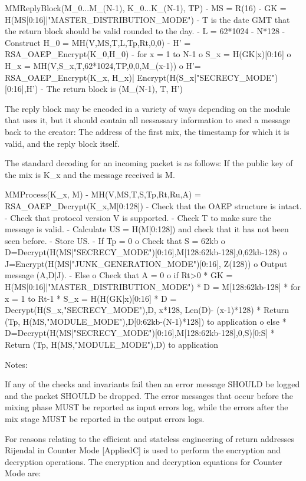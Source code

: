 MMReplyBlock(M_0...M_(N-1), K_0...K_(N-1), TP)
- MS = R(16)
- GK = H(MS[0:16]|"MASTER_DISTRIBUTION_MODE")
- T is the date GMT that the return block should be valid rounded to the day.
- L = 62*1024 - N*128
- Construct H_0 = MH(V,MS,T,L,Tp,Rt,0,0)
- H' = RSA_OAEP_Encrypt(K_0,H_0)
- for x = 1 to N-1
  o S_x = H(GK|x)[0:16]
  o H_x = MH(V,S_x,T,62*1024,TP,0,0,M_(x-1))
  o H'= RSA_OAEP_Encrypt(K_x, H_x)| 
    Encrypt(H(S_x|"SECRECY_MODE")[0:16],H')
- The return block is (M_(N-1), T, H')

The reply block may be encoded in a variety of ways depending on the
module that uses it, but it should contain all nessassary information
to sned a message back to the creator: The address of the first mix,
the timestamp for which it is valid, and the reply block itself.

The standard decoding for an incoming packet is as follows:
If the public key of the mix is K_x and the message received is M.

MMProcess(K_x, M)
- MH(V,MS,T,S,Tp,Rt,Ru,A) = RSA_OAEP_Decrypt(K_x,M[0:128])
- Check that the OAEP structure is intact.
- Check that protocol version V is supported.
- Check T to make sure the message is valid.
- Calculate US = H(M[0:128]) and check that it has not been seen before.
- Store US.
- If Tp = 0
  o Check that S = 62kb
  o D=Decrypt(H(MS|"SECRECY_MODE")[0:16],M[128:62kb-128],0,62kb-128)
  o J=Encrypt(H(MS|"JUNK_GENERATION_MODE")[0:16], Z(128))
  o Output message (A,D|J).
- Else
  o Check that A = 0
  o if Rt>0 
    * GK = H(MS[0:16]|"MASTER_DISTRIBUTION_MODE")
    * D = M[128:62kb-128]
    * for x = 1 to Rt-1
    * S_x = H(H(GK|x)[0:16]
    * D = Decrypt(H(S_x,"SECRECY_MODE"),D, x*128, Len(D)- (x-1)*128)
    * Return (Tp, H(MS,"MODULE_MODE"),D[0:62kb-(N-1)*128]) to application
  o else
    * D=Decrypt(H(MS|"SECRECY_MODE")[0:16],M[128:62kb-128],0,S)[0:S]
    * Return (Tp, H(MS,"MODULE_MODE"),D) to application

Notes:

If any of the checks and invariants fail then an error message SHOULD be logged 
and the packet SHOULD be dropped. The error messages that occur before the 
mixing phase MUST be reported as input errors log, while the errors after the 
mix stage MUST be reported in the output errors logs.

For reasons relating to the efficient and stateless engineering of return 
addresses Rijendal in Counter Mode [AppliedC] is used to perform the 
encryption and decryption operations. The encryption and decryption
equations for Counter Mode are:

